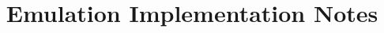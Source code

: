 \documentclass[notitlepage]{report}
\begin{document}
\title{Emulation Implementation Notes}
\maketitle

\end{document}
